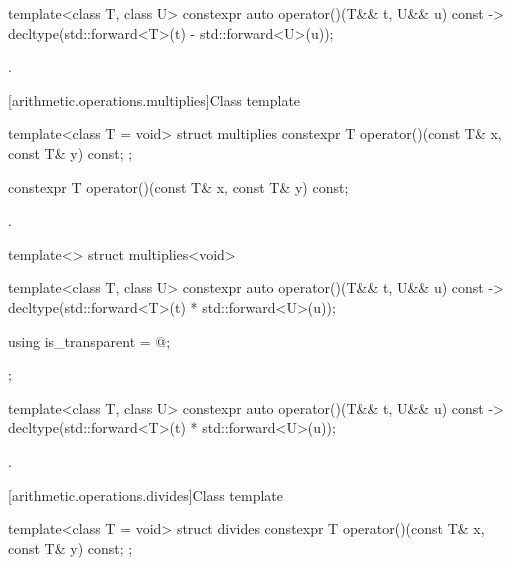 %
\begin{itemdecl}
template<class T, class U> constexpr auto operator()(T&& t, U&& u) const
    -> decltype(std::forward<T>(t) - std::forward<U>(u));
\end{itemdecl}

\begin{itemdescr}
\pnum
\returns
{}.
\end{itemdescr}

[arithmetic.operations.multiplies]{Class template }

%
\begin{itemdecl}
template<class T = void> struct multiplies {
  constexpr T operator()(const T& x, const T& y) const;
};
\end{itemdecl}

%
\begin{itemdecl}
constexpr T operator()(const T& x, const T& y) const;
\end{itemdecl}

\begin{itemdescr}
\pnum
\returns
{}.
\end{itemdescr}

%
\begin{itemdecl}
template<> struct multiplies<void> {
  template<class T, class U> constexpr auto operator()(T&& t, U&& u) const
    -> decltype(std::forward<T>(t) * std::forward<U>(u));

  using is_transparent = @\unspec@;
};
\end{itemdecl}

%
\begin{itemdecl}
template<class T, class U> constexpr auto operator()(T&& t, U&& u) const
    -> decltype(std::forward<T>(t) * std::forward<U>(u));
\end{itemdecl}

\begin{itemdescr}
\pnum
\returns
{}.
\end{itemdescr}

[arithmetic.operations.divides]{Class template }

%
\begin{itemdecl}
template<class T = void> struct divides {
  constexpr T operator()(const T& x, const T& y) const;
};
\end{itemdecl}

